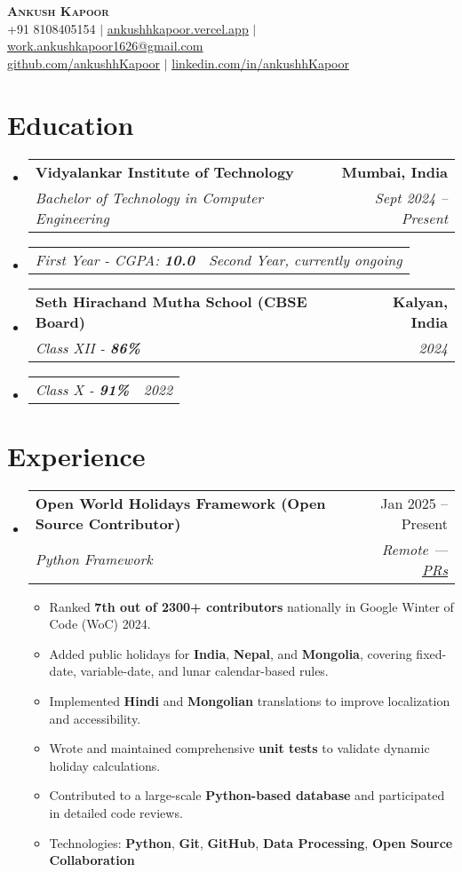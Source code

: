 \documentclass[letterpaper,11pt]{article}
\makeatletter
\newcommand{\resumeItem}[1]{
  \item\small{#1 \vspace{-2pt}}
}
\newcommand{\resumeSubheading}[4]{
  \vspace{-2pt}\item
    \begin{tabular*}{0.97\textwidth}[t]{l@{\extracolsep{\fill}}r}
      \textbf{#1} & #2 \\
      \textit{\small#3} & \textit{\small #4} \\
    \end{tabular*}\vspace{-7pt}
}
\newcommand{\resumeSubSubheading}[2]{
    \item
    \begin{tabular*}{0.97\textwidth}{l@{\extracolsep{\fill}}r}
      \textit{\small#1} & \textit{\small #2} \\
    \end{tabular*}\vspace{-5pt}
}
\newcommand{\resumeSubHeadingListStart}{\begin{itemize}[leftmargin=0.15in, label={}]}
\newcommand{\resumeSubHeadingListEnd}{\end{itemize}}
\newcommand{\resumeItemListStart}{\begin{itemize}}
\newcommand{\resumeItemListEnd}{\end{itemize}\vspace{-5pt}}
\makeatother
\begin{document}
\begin{center}
    \textbf{\Huge \scshape Ankush Kapoor} \\ \vspace{1pt}
    \small +91 8108405154 $|$  \href{https://ankushhkapoor.vercel.app}{\underline{ankushhkapoor.vercel.app}} $|$
    \href{mailto:work.ankushkapoor1626@gmail.com}{\underline{work.ankushkapoor1626@gmail.com}} \\
    \href{https://github.com/ankushhKapoor}{\underline{github.com/ankushhKapoor}} $|$
    \href{https://linkedin.com/in/ankushhKapoor}{\underline{linkedin.com/in/ankushhKapoor}}
\end{center}

\section{Education}
  \resumeSubHeadingListStart
    \resumeSubheading
      {Vidyalankar Institute of Technology}{\textbf{Mumbai, India}}
      {Bachelor of Technology in Computer Engineering}{Sept 2024 -- Present}
    \resumeSubSubheading
      {First Year - CGPA: \textbf{10.0}}{Second Year, currently ongoing}

    \resumeSubheading
      {Seth Hirachand Mutha School (CBSE Board)}{\textbf{Kalyan, India}}
      {Class XII - \textbf{86\%}}{2024}
    \resumeSubSubheading
      {Class X - \textbf{91\%}}{2022}
  \resumeSubHeadingListEnd

\section{Experience}
  \resumeSubHeadingListStart
    \resumeSubheading
      {Open World Holidays Framework (Open Source Contributor)}{Jan 2025 -- Present}
      {Python Framework}{Remote — \href{https://github.com/vacanza/holidays/pulls/ankushhKapoor}{\underline{PRs}}}
      \resumeItemListStart
        \resumeItem{Ranked \textbf{7th out of 2300+ contributors} nationally in Google Winter of Code (WoC) 2024.}
        \resumeItem{Added public holidays for \textbf{India}, \textbf{Nepal}, and \textbf{Mongolia}, covering fixed-date, variable-date, and lunar calendar-based rules.}
        \resumeItem{Implemented \textbf{Hindi} and \textbf{Mongolian} translations to improve localization and accessibility.}
        \resumeItem{Wrote and maintained comprehensive \textbf{unit tests} to validate dynamic holiday calculations.}
        \resumeItem{Contributed to a large-scale \textbf{Python-based database} and participated in detailed code reviews.}
        \resumeItem{Technologies: \textbf{Python}, \textbf{Git}, \textbf{GitHub}, \textbf{Data Processing}, \textbf{Open Source Collaboration}}
      \resumeItemListEnd
  \resumeSubHeadingListEnd
\end{document}

